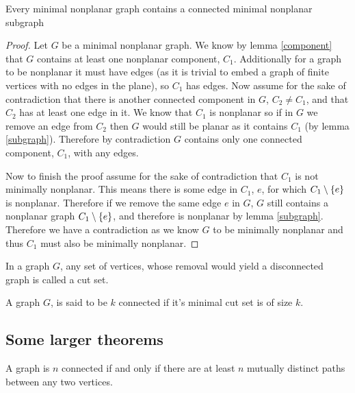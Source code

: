 \documentclass{article}
\begin{document}
\begin{lemma}
	Every minimal nonplanar graph contains a connected minimal nonplanar subgraph
\end{lemma}

\begin{proof}
	Let $G$ be a minimal nonplanar graph. We know by lemma \ref{component} that $G$ contains at least one nonplanar component, $C_1$. Additionally for a graph to be nonplanar it must have edges (as it is trivial to embed a graph of finite vertices with no edges in the plane), so $C_1$ has edges. Now assume for the sake of contradiction that there is another connected component in $G$, $C_2\not=C_1$, and that $C_2$ has at least one edge in it. We know that $C_1$ is nonplanar so if in $G$ we remove an edge from $C_2$ then $G$ would still be planar as it contains $C_1$ (by lemma \ref{subgraph}). Therefore by contradiction $G$ contains only one connected component, $C_1$, with any edges.
	
	Now to finish the proof assume for the sake of contradiction that $C_1$ is not minimally nonplanar. This means there is some edge in $C_1$, $e$, for which $C_1\setminus\left\{ {e} \right\}$ is nonplanar. Therefore if we remove the same edge $e$ in $G$, $G$ still contains a nonplanar graph $C_1\setminus\left\{ {e} \right\}$, and therefore is nonplanar by lemma \ref{subgraph}. Therefore we have a contradiction as we know $G$ to be minimally nonplanar and thus $C_1$ must also be minimally nonplanar.
\end{proof}

\begin{definition}
	In a graph $G$, any set of vertices, whose removal would yield a disconnected graph is called a cut set.
\end{definition}

\begin{definition}[$k$ connected]
	A graph $G$, is said to be $k$ connected if it's minimal cut set is of size $k$.
\end{definition}


\subsection{Some larger theorems}

\begin{theorem}[Menger's theorem] %
	A graph is $n$ connected if and only if there are at least $n$ mutually distinct paths between any two vertices.
\end{theorem}
\end{document}

